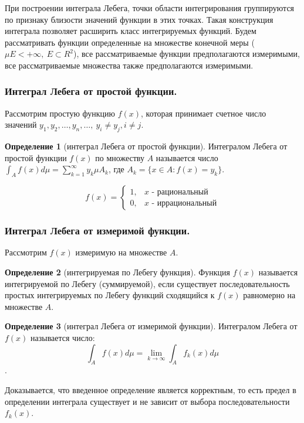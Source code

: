 \documentclass[14pt,a4paper]{extarticle}
\theoremstyle{definition}
\newtheorem{definition}{Определение}[section]
\theoremstyle{remark}
\renewcommand{\[}{\begin{dmath*}[compact]}
\renewcommand{\]}{\end{dmath*}}
\newcommand{\ds}{\displaystyle}
\newcommand{\sep}{ , \ \allowbreak }
\begin{document}
При построении интеграла Лебега,
точки области интегрирования группируются по признаку близости
значений функции в этих точках.
Такая конструкция интеграла позволяет расширить класс интегрируемых функций.
Будем рассматривать функции определенные на множестве конечной меры
($\mu E < +\infty \sep E \subset R^2$),
все рассматриваемые функции предполагаются измеримыми,
все рассматриваемые множества также предполагаются измеримыми.

\subsubsection{Интеграл Лебега от простой функции.}

Рассмотрим простую функцию $f(x)$, которая принимает
счетное число значений
$y_1, y_2, \dots, y_n, \dots \sep y_i \neq y_j, i \neq j$.

\begin{definition}[интеграл Лебега от простой функции]
  Интегралом Лебега от простой функции $f(x)$ по множеству $A$
  называется число $\ds\int_A f(x) d\mu = \sum_{k=1}^\infty y_k\mu A_k$,
  где $A_k=\{x\in A:f(x)=y_k\}$.
\end{definition}

\[f(x) = \begin{cases}
  1, & x\text{ - рациональный} \\
  0, & x\text{ - иррациональный}
\end{cases}\]

\subsubsection{Интеграл Лебега от измеримой функции.}

Рассмотрим $f(x)$ измеримую на множестве $A$.

\begin{definition}[интегрируемая по Лебегу функция]
  Функция $f(x)$ называется интегрируемой по Лебегу (суммируемой),
  если существует последовательность простых интегрируемых по Лебегу функций
  сходящийся к $f(x)$ равномерно на множестве $A$.
\end{definition}

\begin{definition}[интеграл Лебега от измеримой функции]
  Интегралом Лебега от $f(x)$ называется число:
  \[\int_A f(x) d\mu = \lim_{k \to \infty} \int_A f_k(x) d\mu\].
\end{definition}

Доказывается, что введенное определение является корректным,
то есть предел в определении интеграла существует и не зависит
от выбора последовательности $f_k(x)$.
\end{document}
